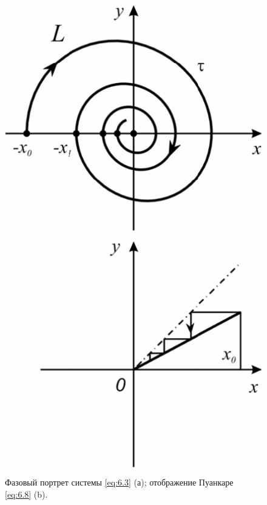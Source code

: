 \begin{figure}[h]
        \centering
        \begin{minipage}{0.49\linewidth}
                \includegraphics[width=\linewidth]{fig/lect6/1a}
        \end{minipage}
        \begin{minipage}{0.49\linewidth}
                \includegraphics[width=\linewidth]{fig/lect6/1b}
        \end{minipage}
        \caption{Фазовый портрет системы \eqref{eq:6.3} (а); отображение Пуанкаре \eqref{eq:6.8} (b).}
        \label{fig:6.1}
\end{figure}

